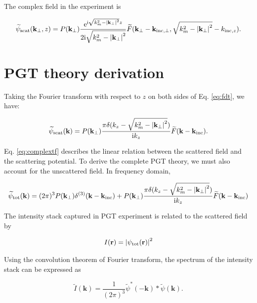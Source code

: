 \documentclass{mynotes}
\begin{document}
The complex field in the experiment is

\begin{equation}
	\widetilde{\psi}_{\text{scat}}(\mathbf{k}_{\perp},z)
	=P(\mathbf{k_{\perp}})
	\frac{\mathrm{e}^{\mathrm{i} \sqrt{k_m^2 - \abs{\mathbf{k}_{\perp}}^2} z}}
	{2\mathrm{i} \sqrt{k_m^2 - \abs{\mathbf{k}_{\perp}}^2}}
	\widetilde{F}(\mathbf{k}_{\perp} - \mathbf{k}_{\text{inc}, \perp}, \sqrt{k_m^2 - \abs{\mathbf{k}_{\perp}}^2} - k_{\text{inc}, z}).
\end{equation}


\section{PGT theory derivation}

Taking the Fourier transform with respect to \(z\) on both sides of Eq. \ref{eq:fdt}, we have:

\begin{equation}\label{eq:complextf}
	\widetilde{\psi}_{\text{scat}}(\mathbf{k})
	=P(\mathbf{k_{\perp}})
	\frac{\pi \delta(k_z - \sqrt{k_m^2 - \abs{\mathbf{k}_{\perp}}^2})}{\mathrm{i} k_z}
	\widetilde{F}(\mathbf{k}-\mathbf{k}_{\text{inc}}).
\end{equation}

Eq. \ref{eq:complextf} describes the linear relation between the scattered field and the scattering potential. To derive the complete PGT theory,
we must also account for the unscattered field. In frequency domain,

\begin{equation}
	\widetilde{\psi}_{\text{tot}}(\mathbf{k})
	=(2 \pi)^3 P(\mathbf{k_{\perp}})\delta^{(3)}(\mathbf{k}-\mathbf{k}_{\text{inc}})
	+P(\mathbf{k_{\perp}})\frac{\pi \delta(k_z - \sqrt{k_m^2 - \abs{\mathbf{k}_{\perp}}^2})}{\mathrm{i} k_z} \widetilde{F}(\mathbf{k}-\mathbf{k}_{\text{inc}})
\end{equation}

The intensity stack captured in PGT experiment is related to the scattered field by

\begin{equation}
	I(\mathbf{r})=\abs{\psi_{\text{tot}}(\mathbf{r})}^2
\end{equation}

Using the convolution theorem of Fourier transform, the spectrum of the intensity stack can be expressed as

\begin{equation}\label{eq:ispec}
	\widetilde{I}(\mathbf{k})
	=\frac{1}{(2\pi)^3} \widetilde{\psi}^*(-\mathbf{k})\ast\widetilde{\psi}(\mathbf{k}).
\end{equation}
\end{document}
